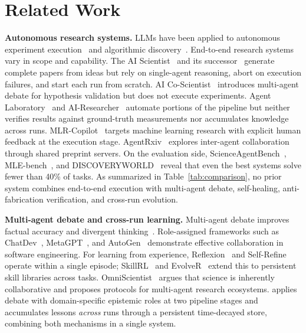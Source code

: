 \section{Related Work}
\label{sec:related}
\vspace{-0.5em}

\noindent \textbf{Autonomous research systems.}
LLMs have been applied to autonomous experiment execution~\citep{boiko2023emergent} and algorithmic discovery~\citep{romera2024mathematical, novikov2025alphaevolve}. End-to-end research systems vary in scope and capability. The AI Scientist~\citep{lu2024aiscientist} and its successor~\citep{yamada2025aiscientistv2} generate complete papers from ideas but rely on single-agent reasoning, abort on execution failures, and start each run from scratch. AI Co-Scientist~\citep{gottweis2025aicoscientist, gottweis2025towards} introduces multi-agent debate for hypothesis validation but does not execute experiments. Agent Laboratory~\citep{schmidgall2025agentlab} and AI-Researcher~\citep{tang2025airesearcher} automate portions of the pipeline but neither verifies results against ground-truth measurements nor accumulates knowledge across runs. MLR-Copilot~\citep{li2024mlrcopilot} targets machine learning research with explicit human feedback at the execution stage. AgentRxiv~\citep{schmidgall2025agentrxiv} explores inter-agent collaboration through shared preprint servers. On the evaluation side, ScienceAgentBench~\citep{tian2024scienceagentbench}, MLE-bench~\citep{chan2024mlebench}, and DISCOVERYWORLD~\citep{jansen2024discoveryworld} reveal that even the best systems solve fewer than 40\% of tasks. As summarized in Table~\ref{tab:comparison}, no prior system combines end-to-end execution with multi-agent debate, self-healing, anti-fabrication verification, and cross-run evolution.

\noindent \textbf{Multi-agent debate and cross-run learning.}
Multi-agent debate improves factual accuracy and divergent thinking~\citep{du2023improving, liang2023encouraging, tran2025multiagent}. Role-assigned frameworks such as ChatDev~\citep{qian2024chatdev}, MetaGPT~\citep{hong2024metagpt}, and AutoGen~\citep{wu2024autogen} demonstrate effective collaboration in software engineering. For learning from experience, Reflexion~\citep{shinn2023reflexion} and Self-Refine~\citep{madaan2023selfrefine} operate within a single episode; SkillRL~\citep{xia2026skillrl} and EvolveR~\citep{wang2025evolver} extend this to persistent skill libraries across tasks. OmniScientist~\citep{shao2025omniscientist} argues that science is inherently collaborative and proposes protocols for multi-agent research ecosystems. \system{} applies debate with domain-specific epistemic roles at two pipeline stages and accumulates lessons \emph{across} runs through a persistent time-decayed store, combining both mechanisms in a single system.

